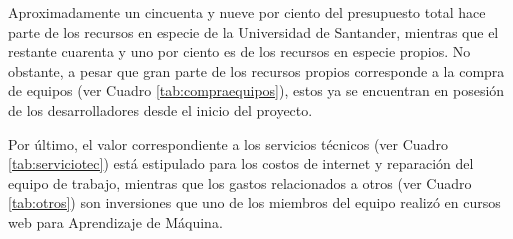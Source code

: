 Aproximadamente un cincuenta y nueve por ciento del presupuesto total hace parte de los recursos en especie de la Universidad de Santander, mientras que el restante cuarenta y uno por ciento es de los recursos en especie propios. No obstante, a pesar que gran parte de los recursos propios corresponde a la compra de equipos (ver Cuadro \ref{tab:compraequipos}), estos ya se encuentran en posesión de los desarrolladores desde el inicio del proyecto. 

Por último, el valor correspondiente a los servicios técnicos (ver Cuadro \ref{tab:serviciotec}) está estipulado para los costos de internet y reparación del equipo de trabajo, mientras que los gastos relacionados a otros (ver Cuadro \ref{tab:otros}) son inversiones que uno de los miembros del equipo realizó en cursos web para Aprendizaje de Máquina.